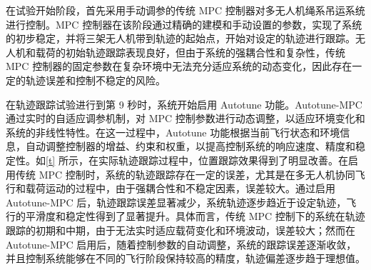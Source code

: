 \documentclass[lang=chs, degree=master, blindreview=false, winfonts=true]{yanputhesis}
\begin{document}
在试验开始阶段，首先采用手动调参的传统 MPC 控制器对多无人机绳系吊运系统进行控制。MPC 控制器在该阶段通过精确的建模和手动设置的参数，实现了系统的初步稳定，并将三架无人机带到轨迹的起始点，开始对设定的轨迹进行跟踪。无人机和载荷的初始轨迹跟踪表现良好，但由于系统的强耦合性和复杂性，传统 MPC 控制器的固定参数在复杂环境中无法充分适应系统的动态变化，因此存在一定的轨迹误差和控制不稳定的风险。


在轨迹跟踪试验进行到第 9 秒时，系统开始启用 Autotune 功能。Autotune-MPC 通过实时的自适应调参机制，对 MPC 控制参数进行动态调整，以适应环境变化和系统的非线性特性。在这一过程中，Autotune 功能根据当前飞行状态和环境信息，自动调整控制器的增益、约束和权重，以提高控制系统的响应速度、精度和稳定性。如\autoref{t} 所示，在实际轨迹跟踪过程中，位置跟踪效果得到了明显改善。在启用传统 MPC 控制时，系统的轨迹跟踪存在一定的误差，尤其是在多无人机协同飞行和载荷运动的过程中，由于强耦合性和不稳定因素，误差较大。通过启用 Autotune-MPC 后，轨迹跟踪误差显著减少，系统轨迹逐步趋近于设定轨迹，飞行的平滑度和稳定性得到了显著提升。具体而言，传统 MPC 控制下的系统在轨迹跟踪的初期和中期，由于无法实时适应载荷变化和环境波动，误差较大；然而在 Autotune-MPC 启用后，随着控制参数的自动调整，系统的跟踪误差逐渐收敛，并且控制系统能够在不同的飞行阶段保持较高的精度，轨迹偏差逐步趋于理想值。
\end{document}
